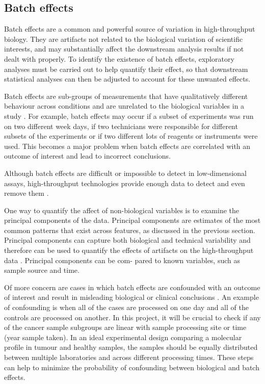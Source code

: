 \newpage


\subsection{Batch effects}

Batch effects are a common and powerful source of variation in high-throughput biology.  They are artifacts not related to the biological variation of scientific interests, and may substantially affect the downstream analysis results if not dealt with properly. 
To identify the existence of batch effects, exploratory analyses must be carried out to help quantify their effect, so that downstream statistical analyses can then be adjusted to account for these unwanted effects. 
 
Batch effects are sub-groups of measurements that have qualitatively different behaviour across conditions and are unrelated to the biological variables in a study \cite{Leek2010TacklingData}. For example, batch effects may occur if a subset of experiments was run on two different week days, if two technicians were responsible for different subsets of the experiments or if two different lots of reagents or instruments were used. This becomes a major problem when batch effects are correlated with an outcome of interest and lead to incorrect conclusions.
 
Although batch effects are difficult or impossible to detect in low-dimensional assays, high-throughput technologies provide enough data to detect and even remove them \cite{Leek2010TacklingData}. 
 
One way to quantify the affect of non-biological variables is to examine the principal components of the data. Principal components are estimates of the most common patterns that exist across features, as discussed in the previous section. Principal components can capture both biological and technical variability and therefore can be used to quantify the effects of artifacts on the high-throughput data \cite{LeekCapturingAnalysis}. Principal components can be com- pared to known variables, such as sample source and time. 
 
Of more concern are cases in which batch effects are confounded with an outcome of interest and result in misleading biological or clinical conclusions \cite{Leek2010TacklingData}. An example of confounding is when all of the cases are processed on one day and all of the controls are processed on another. In this project, it will be crucial to check if any of the cancer sample subgroups are linear with sample processing site or time (year sample taken). In an ideal experimental design comparing a molecular profile in tumour and healthy samples, the samples should be equally distributed between multiple laboratories and across different processing times. These steps can help to minimize the probability of confounding between biological and batch effects.
 
